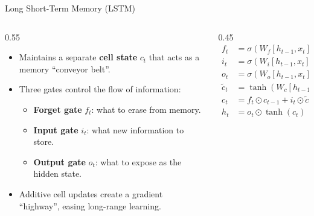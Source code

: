 \begin{frame}{Long Short-Term Memory (LSTM)}
    \begin{columns}
        \begin{column}{0.55\textwidth}
            \begin{itemize}
                \item Maintains a separate \textbf{cell state} $c_t$ that acts as a memory ``conveyor
                      belt''.
                \item Three gates control the flow of information:
                      \begin{itemize}
                          \item \textbf{Forget gate} $f_t$: what to erase from memory.
                          \item \textbf{Input gate} $i_t$: what new information to store.
                          \item \textbf{Output gate} $o_t$: what to expose as the hidden state.
                      \end{itemize}
                \item Additive cell updates create a gradient ``highway'', easing long-range
                      learning.
            \end{itemize}
        \end{column}
        \begin{column}{0.45\textwidth}
            \small
            \begin{align*}
                f_t         & = \sigma(W_f [h_{t-1}, x_t] + b_f)          \\
                i_t         & = \sigma(W_i [h_{t-1}, x_t] + b_i)          \\
                o_t         & = \sigma(W_o [h_{t-1}, x_t] + b_o)          \\
                \tilde{c}_t & = \tanh(W_c [h_{t-1}, x_t] + b_c)           \\
                c_t         & = f_t \odot c_{t-1} + i_t \odot \tilde{c}_t \\
                h_t         & = o_t \odot \tanh(c_t)
            \end{align*}
        \end{column}
    \end{columns}
\end{frame}

